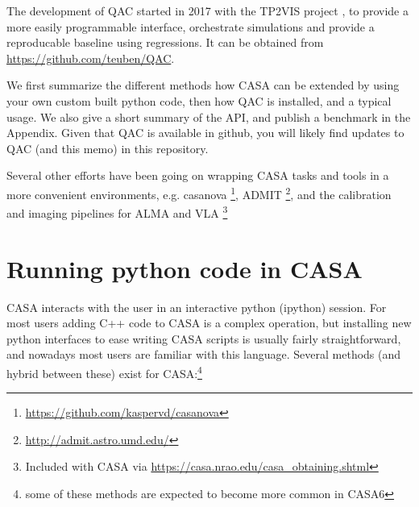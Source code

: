 \documentclass[12pt,a4paper]{article}
\begin{document}


The development of QAC started in 2017 with the TP2VIS project \citep{tp2vis}, to provide a
more easily programmable interface, orchestrate simulations and provide a
reproducable baseline using regressions. It can be obtained from \url{https://github.com/teuben/QAC}.

We first summarize the different methods how CASA can be extended by using your own
custom built python code, then how QAC is installed, and a typical usage. We also give a short
summary of the API, and publish a benchmark in the Appendix. Given that QAC is available
in github, you will likely find updates to QAC (and this memo) in this repository.


Several other efforts have been going on wrapping CASA tasks and tools in a more
convenient environments, e.g. casanova
\footnote{\url{https://github.com/kaspervd/casanova}}, ADMIT
\footnote{\url{http://admit.astro.umd.edu/}}, and the calibration and imaging
pipelines for ALMA and VLA
\footnote{Included with CASA via \url{https://casa.nrao.edu/casa_obtaining.shtml}}



\section{Running python code in CASA}

CASA interacts with the user in an interactive python (ipython) session. For most users adding 
C++ code to CASA is a complex operation, but installing new python interfaces to ease writing CASA scripts
is usually fairly straightforward, and nowadays most users are familiar with this language.
Several methods (and hybrid between these) exist
for CASA:\footnote{some of these methods are expected to become more common in CASA6}
\end{document}
